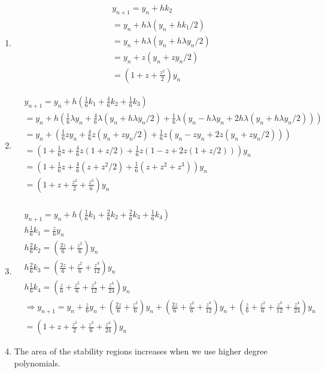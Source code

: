 \documentclass[10pt]{article}
\begin{document}
\begin{enumerate}[label=(\alph*)]
    \item \begin{align*}
        & y_{n+1}=y_n+hk_2\\
        &=y_n+h\lambda(y_n+hk_1/2)\\
        &=y_n+h\lambda(y_n+h\lambda y_n/2)\\
        &=y_n+z(y_n+z y_n/2)\\
        &=(1+z+\frac{z^2}{2})y_n
    \end{align*}
    \item \begin{align*}
        &y_{n+1}=y_n+h(\frac{1}{6}k_1+\frac{4}{6}k_2+\frac{1}{6}k_3)\\
        &=y_n+h(\frac{1}{6}\lambda y_n+\frac{4}{6}\lambda(y_n+h\lambda y_n/2)+\frac{1}{6}\lambda(y_n-h\lambda y_n+2h\lambda(y_n+h\lambda y_n/2)))\\
        &=y_n+(\frac{1}{6}z y_n+\frac{4}{6}z(y_n+z y_n/2)+\frac{1}{6}z(y_n-z y_n+2z(y_n+z y_n/2)))\\
        &=(1+\frac{1}{6}z +\frac{4}{6}z(1+z/2)+\frac{1}{6}z(1-z+2z(1+z/2)))y_n\\
        &=(1+\frac{1}{6}z +\frac{4}{6}(z+z^2/2)+\frac{1}{6}(z+z^2+z^3))y_n\\
        &=(1+z+\frac{z^2}{2}+\frac{z^3}{6})y_n\\
    \end{align*}
    \item \begin{align*}
        &y_{n+1}=y_n+h(\frac{1}{6}k_1+\frac{2}{6}k_2+\frac{2}{6}k_3+\frac{1}{6}k_4)\\
        &h\frac{1}{6}k_1=\frac{z}{6}y_n\\
        &h\frac{2}{6}k_2=(\frac{2z}{6}+\frac{z^2}{6})y_n\\
        &h\frac{2}{6}k_3=(\frac{2z}{6}+\frac{z^2}{6}+\frac{z^3}{12})y_n\\
        &h\frac{1}{6}k_4=(\frac{z}{6}+\frac{z^2}{6}+\frac{z^3}{12}+\frac{z^4}{24})y_n\\
        &\Rightarrow y_{n+1}=y_n+\frac{z}{6}y_n+(\frac{2z}{6}+\frac{z^2}{6})y_n+(\frac{2z}{6}+\frac{z^2}{6}+\frac{z^3}{12})y_n+(\frac{z}{6}+\frac{z^2}{6}+\frac{z^3}{12}+\frac{z^4}{24})y_n\\
        &=(1+z+\frac{z^2}{2}+\frac{z^3}{6}+\frac{z^4}{24})y_n
    \end{align*}
    \pagebreak
    \item The area of the stability regions increases when we use higher degree polynomials.

\end{enumerate}
\end{document}
